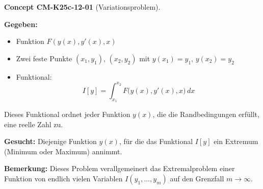 \documentclass[10pt, letterpaper]{article}
\newcommand{\CustomHeading}[3]{%
  \par\medskip\noindent%
  \textbf{#1 #2} \textnormal{(#3)}.\enskip%
}
\newenvironment{CONC}[2]{\CustomHeading{Concept}{#1}{#2}}{}
\begin{document}
\begin{CONC}{CM-K25c-12-01}{Variationsproblem}
\textbf{Gegeben:}
\begin{itemize}
  \item Funktion \( F(y(x), y'(x), x) \)
  \item Zwei feste Punkte \( (x_1, y_1) \), \( (x_2, y_2) \) mit \( y(x_1) = y_1, \, y(x_2) = y_2 \)
  \item Funktional:
  \[
  I[y] = \int_{x_1}^{x_2} F\big(y(x), y'(x), x\big)\, dx
  \]
\end{itemize}

Dieses Funktional ordnet jeder Funktion \( y(x) \), die die Randbedingungen erfüllt, eine reelle Zahl zu.

\vspace{1em}
\textbf{Gesucht:} Diejenige Funktion \( y(x) \), für die das Funktional \( I[y] \) ein Extremum (Minimum oder Maximum) annimmt.

\begin{center}
\end{center}

\textbf{Bemerkung:} Dieses Problem verallgemeinert das Extremalproblem einer Funktion von endlich vielen Variablen \( I(y_1, \dots, y_m) \) auf den Grenzfall \( m \to \infty \).
\end{CONC}
\end{document}

